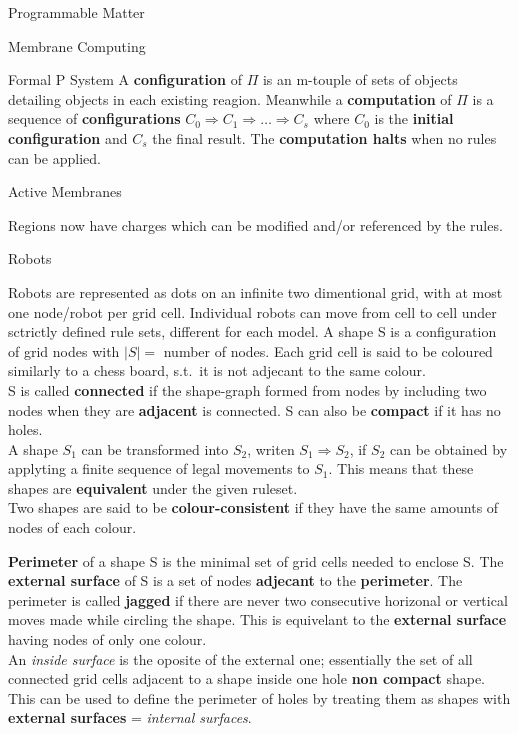 \documentclass[12pt, letterpaper]{article}
\begin{document}
\begin{section}{Programmable Matter}
\begin{subsection}{Membrane Computing}
\begin{subsubsection}{Formal P System}
      A \textbf{configuration} of \(\Pi\) is an m-touple of sets of objects
      detailing objects in each existing reagion. Meanwhile a
      \textbf{computation} of \(\Pi\) is a sequence of \textbf{configurations}
      \(C_{0} \Rightarrow C_{1} \Rightarrow \dots \Rightarrow C_{s}\) where
      \(C_{0}\) is the \textbf{initial configuration} and \(C_{s}\) the final
      result. The \textbf{computation halts} when no rules can be applied.

    \end{subsubsection}

    \begin{subsubsection}{Active Membranes}

      Regions now have charges which can be modified and/or referenced by the
      rules.

    \end{subsubsection}

  \end{subsection}

  \newpage

  \begin{subsection}{Robots}

    Robots are represented as dots on an infinite two dimentional grid, with at
    most one node/robot per grid cell. Individual robots can move from cell to
    cell under sctrictly defined rule sets, different for each model. A shape S
    is a configuration of grid nodes with \(| S | =\) number of nodes. Each
    grid cell is said to be coloured similarly to a chess board, s.t.\ it is
    not adjecant to the same colour. \\
    S is called \textbf{connected} if the shape-graph formed from nodes by
    including two nodes when they are \textbf{adjacent} is connected. S can
    also be \textbf{compact} if it has no holes. \\
    A shape \(S_{1}\) can be transformed into \(S_{2}\), writen \(S_{1}
    \Rightarrow S_{2}\), if \(S_{2}\) can be obtained by applyting a finite
    sequence of legal movements to \(S_{1}\). This means that these shapes are
    \textbf{equivalent} under the given ruleset. \\
    Two shapes are said to be \textbf{colour-consistent} if they have the same
    amounts of nodes of each colour.

    \textbf{Perimeter} of a shape S is the minimal set of grid cells needed to
    enclose S. The \textbf{external surface} of S is a set of nodes
    \textbf{adjecant} to the \textbf{perimeter}. The perimeter is called
    \textbf{jagged} if there are never two consecutive horizonal or vertical
    moves made while circling the shape. This is equivelant to the
    \textbf{external surface} having nodes of only one colour. \\
    An \textit{inside surface} is the oposite of the external one; essentially
    the set of all connected grid cells adjacent to a shape inside one hole
    \textbf{non compact} shape. This can be used to define the perimeter of
    holes by treating them as shapes with \textbf{external surfaces} =
    \textit{internal surfaces}.


\end{subsection}
\end{section}
\end{document}
